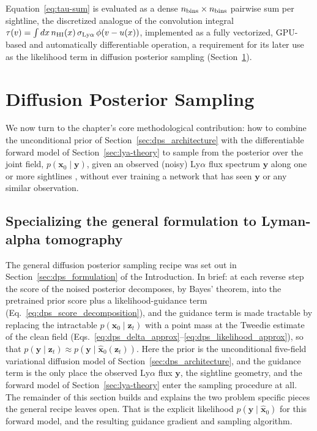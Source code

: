 Equation~\ref{eq:tau-sum} is evaluated as a dense $n_{\rm bins}\times n_{\rm bins}$ pairwise sum per sightline, the discretized analogue of the convolution integral $\tau(v) = \int dx\,n_{\rm HI}(x)\,\sigma_{\rm Ly\alpha}\,\phi(v-u(x))$, implemented as a fully vectorized, GPU-based and automatically differentiable operation, a requirement for its later use as the likelihood term in diffusion posterior sampling (Section~\ref{sec:dps_theory}).



\section{Diffusion Posterior Sampling}
\label{sec:dps_theory}

We now turn to the chapter's core methodological contribution: how to combine the unconditional prior of Section~\ref{sec:dps_architecture} with the differentiable forward model of Section~\ref{sec:lya-theory} to sample from the posterior over the joint field, $p(\bm{x}_0\mid\bm{y})$, given an observed (noisy) Ly$\alpha$ flux spectrum $\bm{y}$ along one or more sightlines , without ever training a network that has seen $\bm y$ or any similar observation.

\subsection{Specializing the general formulation to Lyman-alpha tomography}
\label{sec:dps_guided}

The general diffusion posterior sampling recipe was set out in Section~\ref{sec:dps_formulation} of the Introduction. In brief: at each reverse step the score of the noised posterior decomposes, by Bayes' theorem, into the pretrained prior score plus a likelihood-guidance term (Eq.~\ref{eq:dps_score_decomposition}), and the guidance term is made tractable by replacing the intractable $p(\bm{x}_0\mid\bm{z}_t)$ with a point mass at the Tweedie estimate of the clean field (Eqs.~\ref{eq:dps_delta_approx}--\ref{eq:dps_likelihood_approx}), so that $p(\bm{y}\mid\bm{z}_t)\approx p(\bm{y}\mid\hat{\bm{x}}_0(\bm{z}_t))$. Here the prior is the unconditional five-field variational diffusion model of Section~\ref{sec:dps_architecture}, and the guidance term is the only place the observed Ly$\alpha$ flux $\bm{y}$, the sightline geometry, and the forward model of Section~\ref{sec:lya-theory} enter the sampling procedure at all. The remainder of this section builds and explains the two problem specific pieces the general recipe leaves open. That is the explicit likelihood $p(\bm{y}\mid\hat{\bm{x}}_0)$ for this forward model, and the resulting guidance gradient and sampling algorithm.

